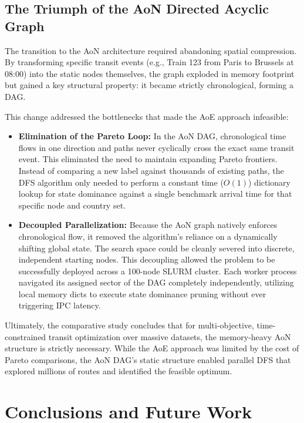 \subsection{The Triumph of the AoN Directed Acyclic Graph}
\label{subsec:triumph_aon_dag}

The transition to the AoN architecture required abandoning spatial compression. By transforming specific transit events (e.g., Train 123 from Paris to Brussels at 08:00) into the static nodes themselves, the graph exploded in memory footprint but gained a key structural property: it became strictly chronological, forming a DAG.

This change addressed the bottlenecks that made the AoE approach infeasible:
\begin{itemize}
    \item \textbf{Elimination of the Pareto Loop:} In the AoN DAG, chronological time flows in one direction and paths never cyclically cross the exact same transit event. This eliminated the need to maintain expanding Pareto frontiers. Instead of comparing a new label against thousands of existing paths, the DFS algorithm only needed to perform a constant time ($O(1)$) dictionary lookup for state dominance against a single benchmark arrival time for that specific node and country set.
    \item \textbf{Decoupled Parallelization:} Because the AoN graph natively enforces chronological flow, it removed the algorithm's reliance on a dynamically shifting global state. The search space could be cleanly severed into discrete, independent starting nodes. This decoupling allowed the problem to be successfully deployed across a 100-node SLURM cluster. Each worker process navigated its assigned sector of the DAG completely independently, utilizing local memory dicts to execute state dominance pruning without ever triggering IPC latency.
\end{itemize}

Ultimately, the comparative study concludes that for multi-objective, time-constrained transit optimization over massive datasets, the memory-heavy AoN structure is strictly necessary. While the AoE approach was limited by the cost of Pareto comparisons, the AoN DAG's static structure enabled parallel DFS that explored millions of routes and identified the feasible optimum.

\section{Conclusions and Future Work}
\label{sec:conclusions_future_work}

